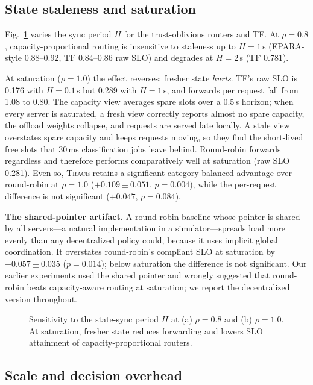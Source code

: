 \documentclass[journal]{IEEEtran}
\newcommand{\sys}{\textsc{Trace}}
\begin{document}
\subsection{State staleness and saturation}\label{sec:res-stale}

Fig.~\ref{fig:stale} varies the sync period $H$ for the trust-oblivious routers and TF. At $\rho=0.8$, capacity-proportional routing is insensitive to staleness up to $H=1$\,s (EPARA-style 0.88--0.92, TF 0.84--0.86 raw SLO) and degrades at $H=2$\,s (TF 0.781).

At saturation ($\rho=1.0$) the effect reverses: fresher state \emph{hurts}. TF's raw SLO is 0.176 with $H=0.1$\,s but 0.289 with $H=1$\,s, and forwards per request fall from 1.08 to 0.80. The capacity view averages spare slots over a 0.5\,s horizon; when every server is saturated, a fresh view correctly reports almost no spare capacity, the offload weights collapse, and requests are served late locally. A stale view overstates spare capacity and keeps requests moving, so they find the short-lived free slots that 30\,ms classification jobs leave behind. Round-robin forwards regardless and therefore performs comparatively well at saturation (raw SLO 0.281). Even so, \sys{} retains a significant category-balanced advantage over round-robin at $\rho=1.0$ ($+0.109\pm0.051$, $p=0.004$), while the per-request difference is not significant ($+0.047$, $p=0.084$).

\textbf{The shared-pointer artifact.} A round-robin baseline whose pointer is shared by all servers---a natural implementation in a simulator---spreads load more evenly than any decentralized policy could, because it uses implicit global coordination. It overstates round-robin's compliant SLO at saturation by $+0.057\pm0.035$ ($p=0.014$); below saturation the difference is not significant. Our earlier experiments used the shared pointer and wrongly suggested that round-robin beats capacity-aware routing at saturation; we report the decentralized version throughout.

\begin{figure}[t]
\centering
\resizebox{\columnwidth}{!}{%
}
\caption{Sensitivity to the state-sync period $H$ at (a) $\rho=0.8$ and (b) $\rho=1.0$. At saturation, fresher state reduces forwarding and lowers SLO attainment of capacity-proportional routers.}
\label{fig:stale}
\end{figure}

\subsection{Scale and decision overhead}\label{sec:res-scale}
\end{document}

